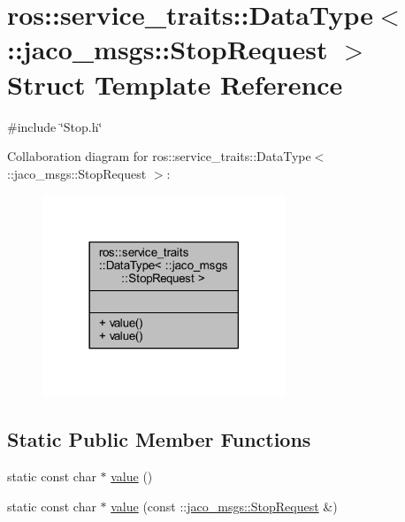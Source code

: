 \hypertarget{structros_1_1service__traits_1_1DataType_3_01_1_1jaco__msgs_1_1StopRequest_01_4}{}\section{ros\+:\+:service\+\_\+traits\+:\+:Data\+Type$<$ \+:\+:jaco\+\_\+msgs\+:\+:Stop\+Request $>$ Struct Template Reference}
\label{structros_1_1service__traits_1_1DataType_3_01_1_1jaco__msgs_1_1StopRequest_01_4}


{\ttfamily \#include \char`\"{}Stop.\+h\char`\"{}}



Collaboration diagram for ros\+:\+:service\+\_\+traits\+:\+:Data\+Type$<$ \+:\+:jaco\+\_\+msgs\+:\+:Stop\+Request $>$\+:
\nopagebreak
\begin{figure}[H]
\begin{center}
\leavevmode
\includegraphics[width=206pt]{d1/dba/structros_1_1service__traits_1_1DataType_3_01_1_1jaco__msgs_1_1StopRequest_01_4__coll__graph}
\end{center}
\end{figure}
\subsection*{Static Public Member Functions}
\begin{DoxyCompactItemize}
\item 
static const char $\ast$ \hyperlink{structros_1_1service__traits_1_1DataType_3_01_1_1jaco__msgs_1_1StopRequest_01_4_a882850f3434c292f9fd6177b76711255}{value} ()
\item 
static const char $\ast$ \hyperlink{structros_1_1service__traits_1_1DataType_3_01_1_1jaco__msgs_1_1StopRequest_01_4_ace750f4b6bafc9f8507c1bee0642c6aa}{value} (const \+::\hyperlink{namespacejaco__msgs_a7f71a39d70d57c48cf1d0e67cb41d127}{jaco\+\_\+msgs\+::\+Stop\+Request} \&)
\end{DoxyCompactItemize}


